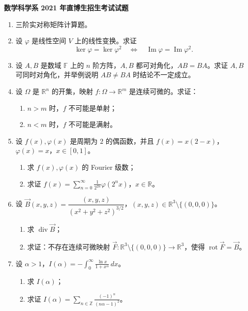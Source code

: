 \documentclass[UTF8,11pt,fontset=none]{ctexart}
\newcommand{\paperheading}[1]{\begin{center}\Large\bfseries #1\end{center}\vspace{.45em}}
\newcommand{\newpaper}[1]{\clearpage\paperheading{#1}}
\begin{document}
\newpaper{数学科学系 2021 年直博生招生考试试题}
\begin{enumerate}
\item 三阶实对称矩阵计算题。
\item 设 $\varphi$ 是线性空间 $V$ 上的线性变换。求证
\[
\ker\varphi=\ker\varphi^2
\quad\Longleftrightarrow\quad
\operatorname{Im}\varphi=\operatorname{Im}\varphi^2.
\]
\item 设 $A,B$ 是数域 $\mathbb F$ 上的 $n$ 阶方阵，$A,B$ 都可对角化，$AB=BA$。求证 $A,B$ 可同时对角化，并举例说明 $AB\ne BA$ 时结论不一定成立。
\item 设 $\Omega$ 是 $\mathbb R^n$ 的开集，映射 $f:\Omega\to\mathbb R^m$ 是连续可微的。求证：
\begin{enumerate}
\item $n>m$ 时，$f$ 不可能是单射；
\item $n<m$ 时，$f$ 不可能是满射。
\end{enumerate}
\item 设 $f(x),\varphi(x)$ 是周期为 $2$ 的偶函数，并且 $f(x)=x(2-x)$，$\varphi(x)=x$，$x\in[0,1]$。
\begin{enumerate}
\item 求 $f(x),\varphi(x)$ 的 Fourier 级数；
\item 求证 $\displaystyle f(x)=\sum_{n=0}^{\infty}\frac1{2^{2n}}\varphi(2^n x)$，$x\in\mathbb R$。
\end{enumerate}
\item 设 $\vec B(x,y,z)=\dfrac{(x,y,z)}{(x^2+y^2+z^2)^{3/2}}$，$(x,y,z)\in\mathbb R^3\setminus\{(0,0,0)\}$。
\begin{enumerate}
\item 求 $\operatorname{div}\vec B$；
\item 求证：不存在连续可微映射 $\vec F:\mathbb R^3\setminus\{(0,0,0)\}\to\mathbb R^3$，使得 $\operatorname{rot}\vec F=\vec B$。
\end{enumerate}
\item 设 $\alpha>1$，$I(\alpha)=-\displaystyle\int_0^{\infty}\frac{\ln x}{1+x^\alpha}\,dx$。
\begin{enumerate}
\item 求 $I(\alpha)$；
\item 求证 $\displaystyle I(\alpha)=\sum_{n\in\mathbb Z}\frac{(-1)^n}{(n\alpha-1)^2}$。
\end{enumerate}
\end{enumerate}
\end{document}
